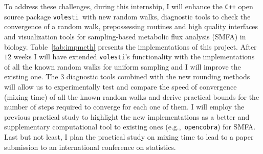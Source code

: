\documentclass[a4paper, 12pt]{article}
\def \c++{{\tt C++}}
\def\volesti{{\tt volesti}}
\def\R{{\tt R}}
\begin{document}

To address these challenges, during this internship, I will enhance the {\tt C++} open source package \volesti\ with new random walks, diagnostic tools to check the convergence of a random walk, prepossessing routines and high quality interfaces and visualization tools for sampling-based metabolic flux analysis (SMFA) in biology. 
Table~\ref{tab:impmeth} presents the implementations of this project. After $12$ weeks I will have extended \volesti's functionality with the implementations of all the known random walks for uniform sampling and I will improve the existing one. The $3$ diagnostic tools combined with the new rounding methods will allow us to experimentally test and compare the speed of convergence (mixing time) of all the known random walks and derive practical bounds for the number of steps required to converge for each one of them. I will employ the previous practical study to highlight the new implementations as a better and supplementary computational tool to existing ones (e.g.,\ {\tt opencobra}) for SMFA. Last but not least, I plan the practical study on mixing time to lead to a paper submission to an international conference on statistics.




\end{document}
